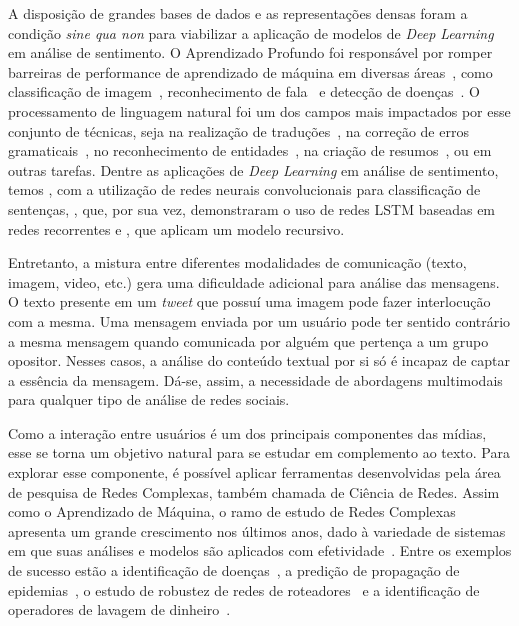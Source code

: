 A disposição de grandes bases de dados e as representações densas foram a
condição \textit{sine qua non} para viabilizar a aplicação de modelos de
\textit{Deep Learning} em análise de sentimento.
O Aprendizado Profundo foi responsável por romper barreiras de performance
de aprendizado de máquina em diversas áreas~\cite{lecun15}, como classificação
de imagem~\cite{krizhevsky12}, reconhecimento de fala~\cite{hinton12a} e detecção
de doenças~\cite{esteva17}.
O processamento de linguagem natural foi um dos campos mais impactados por esse
conjunto de técnicas, seja na realização de traduções~\cite{vaswani17},
na correção de erros gramaticais~\cite{ge18}, no reconhecimento de
entidades~\cite{akbik18}, na criação de resumos~\cite{wu18}, ou em outras
tarefas.
Dentre as aplicações de \textit{Deep Learning} em análise de sentimento,
temos \citet{kim14}, com a utilização de redes neurais convolucionais para
classificação de sentenças, \citet{zhou16}, que, por sua vez, demonstraram o
uso de redes LSTM baseadas em redes recorrentes e \citet{socher13}, que aplicam um
modelo recursivo.

Entretanto, a mistura entre diferentes modalidades de comunicação (texto, imagem,
video, etc.) gera uma dificuldade adicional para análise das mensagens.
O texto presente em um \textit{tweet} que possuí uma imagem pode fazer
interlocução com a mesma.
Uma mensagem enviada por um usuário pode ter sentido contrário a mesma mensagem
quando comunicada por alguém que pertença a um grupo opositor.
Nesses casos, a análise do conteúdo textual por si só é incapaz de captar a
essência da mensagem.
Dá-se, assim, a necessidade de abordagens multimodais para qualquer tipo de
análise de redes sociais.

Como a interação entre usuários é um dos principais componentes das mídias, esse
se torna um objetivo natural para se estudar em complemento ao texto.
Para explorar esse componente, é possível aplicar ferramentas desenvolvidas pela
área de pesquisa de Redes Complexas, também chamada de Ciência de Redes.
Assim como o Aprendizado de Máquina, o ramo de estudo de Redes Complexas
apresenta um grande crescimento nos últimos anos, dado à variedade de sistemas em
que suas análises e modelos são aplicados com efetividade~\cite{albert02}.
Entre os exemplos de sucesso estão a identificação de doenças~\cite{barabasi11},
a predição de propagação de epidemias~\cite{hufnagel04}, o estudo de robustez de
redes de roteadores~\cite{albert00} e a identificação de operadores de lavagem de
dinheiro~\cite{colladon17}.


